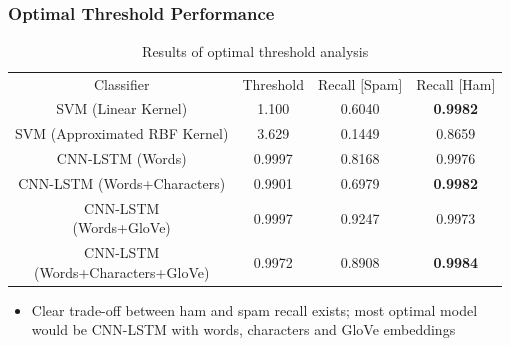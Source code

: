 \documentclass{beamer}
\begin{document}
\subsection{}
\begin{framefont}{\footnotesize}
	\begin{frame}
		\frametitle{Optimal Threshold Performance}
		\begin{table}
			\centering
			\bgroup
			\def\arraystretch{1.5}
			\begin{tabular}{|c|c|c|c|} \hline
				Classifier & Threshold & Recall $\lbrack$Spam$\rbrack$ & Recall $\lbrack$Ham$\rbrack$ \\ \hhline{|=|=|=|=|}
				SVM (Linear Kernel) & 1.100 &  \color{red} 0.6040 & \textbf{0.9982} \\ \hline
				SVM (Approximated RBF Kernel) & 3.629 & 0.1449 & 0.8659 \\ \hline
				CNN-LSTM (Words) & 0.9997 & 0.8168 & 0.9976 \\ \hline
				CNN-LSTM (Words+Characters) & 0.9901 &  \color{red} 0.6979 &  \textbf{0.9982} \\ \hline
				\makecell{CNN-LSTM \\(Words+GloVe)} & 0.9997  & 0.9247 & 0.9973 \\ \hline
				\makecell{CNN-LSTM \\(Words+Characters+GloVe)} & 0.9972 & \color{ao(english)} 0.8908 & \textbf{0.9984} \\ \hline
			\end{tabular}
			\egroup
			\caption{Results of optimal threshold analysis}
		\end{table}
	\vspace{-10pt}
	\begin{itemize}
		\item Clear trade-off between ham and spam recall exists; most optimal model would be CNN-LSTM with words, characters and GloVe embeddings
	\end{itemize}
	\end{frame}
\end{framefont}
\end{document}
